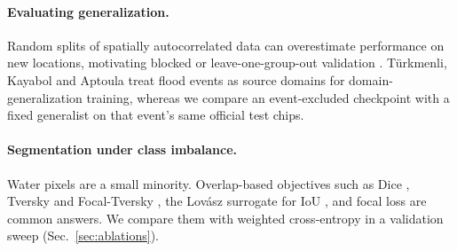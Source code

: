 \paragraph{Evaluating generalization.}
Random splits of spatially autocorrelated data can overestimate
performance on new locations, motivating blocked or leave-one-group-out
validation \cite{roberts2017}. T{\"u}rkmenli, Kayabol and Aptoula
\cite{turkmenli2025} treat flood events as source domains for
domain-generalization training, whereas we compare an event-excluded
checkpoint with a fixed generalist on that event's same official test
chips.

\paragraph{Segmentation under class imbalance.}
Water pixels are a small minority. Overlap-based objectives such as Dice
\cite{milletari2016}, Tversky \cite{salehi2017} and Focal-Tversky
\cite{abraham2019}, the Lov\'asz surrogate for IoU \cite{berman2018},
and focal loss \cite{lin2017focal} are common answers. We compare them
with weighted cross-entropy in a validation sweep (Sec.~\ref{sec:ablations}).
